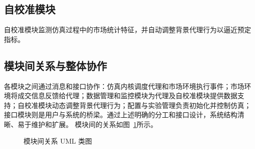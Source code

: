\subsection{自校准模块\label{subsec:calibration}}

自校准模块监测仿真过程中的市场统计特征，并自动调整背景代理行为以逼近预定指标。

\subsection{模块间关系与整体协作}

各模块之间通过消息和接口协作：仿真内核调度代理和市场环境执行事件；市场环境将成交信息反馈给代理；数据管理和监控模块为代理及自校准模块提供数据支持；自校准模块动态调整背景代理行为；配置与实验管理负责初始化并控制仿真；接口模块则是用户与系统的桥梁。通过上述明确的分工和接口设计，系统结构清晰、易于维护和扩展。
模块间的关系如图~\ref{fig:uml_interaction}所示。

\begin{figure}[H]
  \centering
  \resizebox{0.9\linewidth}{!}{}
  \caption{模块间关系 UML 类图}
  \label{fig:uml_interaction}
\end{figure}
